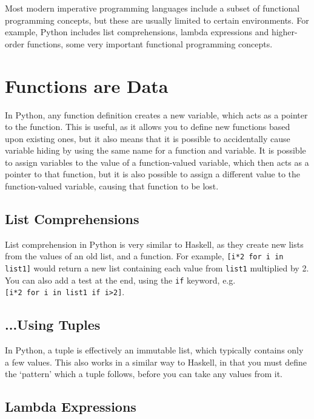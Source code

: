 
Most modern imperative programming languages include a subset of functional programming concepts, but these are usually
 limited to certain environments. For example, Python includes list comprehensions, lambda expressions and higher-order
 functions, some very important functional programming concepts.

\section*{Functions are Data}

In Python, any function definition creates a new variable, which acts as a pointer to the function. This is useful, as
 it allows you to define new functions based upon existing ones, but it also means that it is possible to accidentally
 cause variable hiding by using the same name for a function and variable. It is possible to assign variables to the
 value of a function-valued variable, which then acts as a pointer to that function, but it is also possible to assign
 a different value to the function-valued variable, causing that function to be lost.

\subsection*{List Comprehensions}

List comprehension in Python is very similar to Haskell, as they create new lists from the values of an old list, and a
 function. For example, \verb`[i*2 for i in list1]` would return a new list containing each value from \verb`list1`
 multiplied by 2. You can also add a test at the end, using the \verb`if` keyword, e.g.\\\verb`[i*2 for i in list1 if i>2]`.

\subsection*{...Using Tuples}

In Python, a tuple is effectively an immutable list, which typically contains only a few values. This also works in a
 similar way to Haskell, in that you must define the `pattern' which a tuple follows, before you can take any values
 from it.

\subsection*{Lambda Expressions}

